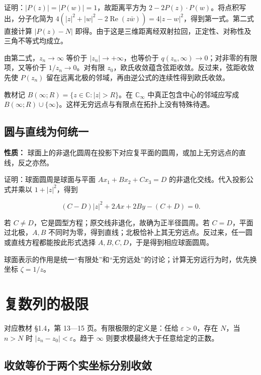 \documentclass[11pt,a4paper]{article}
\begin{document}
证明：\(|P(z)|=|P(w)|=1\)，故距离平方为
\(2-2P(z)\cdot P(w)\)。将点积写出，分子化简为
\(4(|z|^2+|w|^2-2\operatorname{Re}(z\bar w))=4|z-w|^2\)，得到第一式。第二式直接计算
\(|P(z)-N|\)
即得。由于这是三维距离经双射拉回，正定性、对称性及三角不等式均成立。

由第二式，\(z_n\to\infty\) 等价于 \(|z_n|\to+\infty\)，也等价于
\(q(z_n,\infty)\to0\)；对非零的有限项，又等价于 \(1/z_n\to0\)。对有限
\(z_0\)，欧氏收敛蕴含弦距收敛。反过来，弦距收敛先使 \(P(z_n)\)
留在远离北极的邻域，再由逆公式的连续性得到欧氏收敛。

教材记 \(B(\infty;R)=\{z\in\mathbb C:|z|>R\}\)。在 \(\mathbb C_\infty\)
中真正包含中心的邻域应写成
\(B(\infty;R)\cup\{\infty\}\)。这样无穷远点与有限点在拓扑上没有特殊待遇。

\subsection{圆与直线为何统一}\label{ux5706ux4e0eux76f4ux7ebfux4e3aux4f55ux7edfux4e00}

\textbf{性质：}
球面上的非退化圆周在投影下对应复平面的圆周，或加上无穷远点的直线，反之亦然。

证明：球面圆周是球面与平面 \(Ax_1+Bx_2+Cx_3=D\)
的非退化交线。代入投影公式并乘以 \(1+|z|^2\)，得到

\[
(C-D)|z|^2+2Ax+2By-(C+D)=0.
\]

若 \(C\ne D\)，它是圆型方程；原交线非退化，故确为正半径圆周。若
\(C=D\)，平面过北极，\(A,B\)
不同时为零，得到直线；北极恰补上其无穷远点。反过来，任一圆或直线方程都能按此形式选择
\(A,B,C,D\)，于是得到相应球面圆周。

球面表示的作用是统一``有限处''和``无穷远处''的讨论；计算无穷远行为时，优先换坐标
\(\zeta=1/z\)。

\section{复数列的极限}
对应教材 §1.4，第 13---15 页。有限极限的定义是：任给
\(\varepsilon>0\)，存在 \(N\)，当 \(n>N\) 时
\(|z_n-z_0|<\varepsilon\)。趋于 \(\infty\)
则要求模最终大于任意给定的正数。

\subsection{收敛等价于两个实坐标分别收敛}\label{ux6536ux655bux7b49ux4ef7ux4e8eux4e24ux4e2aux5b9eux5750ux6807ux5206ux522bux6536ux655b}
\end{document}
